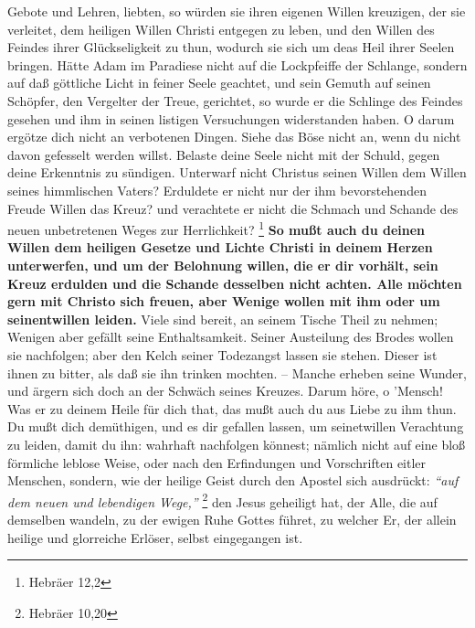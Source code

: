 Gebote und Lehren, liebten, so würden sie ihren eigenen Willen kreuzigen, der
sie verleitet, dem heiligen Willen Christi entgegen zu leben, und den Willen des
Feindes ihrer Glückseligkeit zu thun, wodurch sie sich um deas Heil ihrer Seelen
bringen. Hätte Adam im Paradiese nicht auf die Lockpfeiffe der Schlange, sondern
auf daß göttliche Licht in feiner Seele geachtet, und sein Gemuth auf seinen
Schöpfer, den Vergelter der Treue, gerichtet, so wurde er die Schlinge des
Feindes gesehen und ihm in seinen listigen Versuchungen widerstanden haben. O
darum ergötze dich nicht an verbotenen Dingen. Siehe das Böse nicht an, wenn du
nicht davon gefesselt werden willst. Belaste deine Seele nicht mit der Schuld,
gegen deine Erkenntnis zu sündigen. Unterwarf nicht Christus seinen Willen dem
Willen seines himmlischen Vaters? Erduldete er nicht nur der ihm bevorstehenden
Freude Willen das Kreuz? und verachtete er nicht die Schmach und Schande des
neuen unbetretenen Weges zur Herrlichkeit?
\footnote{Hebräer 12,2}
\textbf{So mußt
auch du
deinen Willen dem heiligen Gesetze und Lichte Christi in deinem Herzen
unterwerfen, und um der Belohnung willen, die er dir vorhält, sein Kreuz
erdulden und die Schande desselben nicht achten. Alle möchten gern mit Christo
sich freuen, aber Wenige wollen mit ihm oder um seinentwillen leiden.} Viele
sind
bereit, an seinem Tische Theil zu nehmen; Wenigen aber gefällt seine
Enthaltsamkeit. Seiner Austeilung des Brodes wollen sie nachfolgen; aber den
Kelch seiner Todezangst lassen sie stehen. Dieser ist ihnen zu bitter, als daß
sie ihn trinken mochten. -- Manche erheben seine Wunder, und ärgern sich doch an
der Schwäch seines Kreuzes. Darum höre, o ’Mensch! Was er zu deinem Heile für
dich that, das mußt auch du aus Liebe zu ihm thun. Du mußt dich demüthigen, und
es dir gefallen lassen, um seinetwillen Verachtung zu leiden, damit du ihn:
wahrhaft nachfolgen könnest; nämlich nicht auf eine bloß förmliche leblose
Weise, oder nach den Erfindungen und Vorschriften eitler Menschen, sondern, wie
der heilige Geist durch den Apostel sich ausdrückt:
\textit{"`auf dem neuen und
lebendigen Wege,"'}
\footnote{Hebräer 10,20}
den Jesus geheiligt hat, der Alle, die
auf demselben wandeln, zu der ewigen Ruhe Gottes führet, zu welcher Er, der
allein heilige und glorreiche Erlöser, selbst eingegangen ist.



